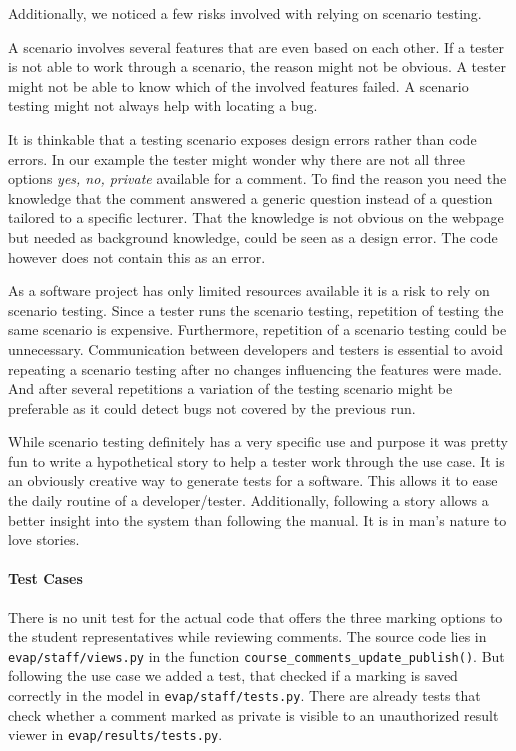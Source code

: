 Additionally, we noticed a few risks involved with relying on scenario testing.

A scenario involves several features that are even based on each other.
If a tester is not able to work through a scenario, the reason might not be obvious.
A tester might not be able to know which of the involved features failed.
A scenario testing might not always help with locating a bug.

It is thinkable that a testing scenario exposes design errors rather than code errors.
In our example the tester might wonder why there are not all three options \emph{yes, no, private} available for a comment. 
To find the reason you need the knowledge that the comment answered a generic question instead of a question tailored to a specific lecturer.
That the knowledge is not obvious on the webpage but needed as background knowledge, could be seen as a design error.
The code however does not contain this as an error.

As a software project has only limited resources available it is a risk to rely on scenario testing.
Since a tester runs the scenario testing, repetition of testing the same scenario is expensive.
Furthermore, repetition of a scenario testing could be unnecessary.
Communication between developers and testers is essential to avoid repeating a scenario testing after no changes influencing the features were made.
And after several repetitions a variation of the testing scenario might be preferable as it could detect bugs not covered by the previous run.

While scenario testing definitely has a very specific use and purpose it was pretty fun to write a hypothetical story to help a tester work through the use case.
It is an obviously creative way to generate tests for a software.
This allows it to ease the daily routine of a developer/tester.
Additionally, following a story allows a better insight into the system than following the manual.
It is in man's nature to love stories.

\paragraph{Test Cases}
There is no unit test for the actual code that offers the three marking options to the student representatives while reviewing comments.
The source code lies in \texttt{evap/staff/views.py} in the function \texttt{course\_comments\_update\_publish()}.
But following the use case we added a test, that checked if a marking is saved correctly in the model in \texttt{evap/staff/tests.py}.
There are already tests that check whether a comment marked as private is visible to an unauthorized result viewer in \texttt{evap/results/tests.py}.

